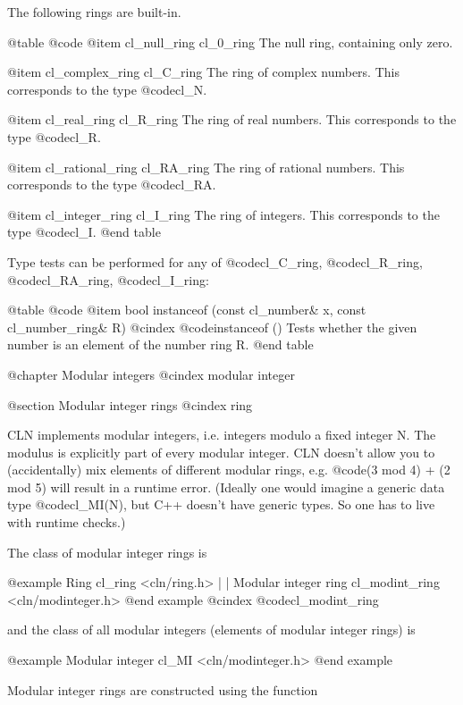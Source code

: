 The following rings are built-in.

@table @code
@item cl_null_ring cl_0_ring
The null ring, containing only zero.

@item cl_complex_ring cl_C_ring
The ring of complex numbers. This corresponds to the type @code{cl_N}.

@item cl_real_ring cl_R_ring
The ring of real numbers. This corresponds to the type @code{cl_R}.

@item cl_rational_ring cl_RA_ring
The ring of rational numbers. This corresponds to the type @code{cl_RA}.

@item cl_integer_ring cl_I_ring
The ring of integers. This corresponds to the type @code{cl_I}.
@end table

Type tests can be performed for any of @code{cl_C_ring}, @code{cl_R_ring},
@code{cl_RA_ring}, @code{cl_I_ring}:

@table @code
@item bool instanceof (const cl_number& x, const cl_number_ring& R)
@cindex @code{instanceof ()}
Tests whether the given number is an element of the number ring R.
@end table


@chapter Modular integers
@cindex modular integer

@section Modular integer rings
@cindex ring

CLN implements modular integers, i.e. integers modulo a fixed integer N.
The modulus is explicitly part of every modular integer. CLN doesn't
allow you to (accidentally) mix elements of different modular rings,
e.g. @code{(3 mod 4) + (2 mod 5)} will result in a runtime error.
(Ideally one would imagine a generic data type @code{cl_MI(N)}, but C++
doesn't have generic types. So one has to live with runtime checks.)

The class of modular integer rings is

@example
                         Ring
                       cl_ring
                     <cln/ring.h>
                          |
                          |
                 Modular integer ring
                    cl_modint_ring
                  <cln/modinteger.h>
@end example
@cindex @code{cl_modint_ring}

and the class of all modular integers (elements of modular integer rings) is

@example
                    Modular integer
                         cl_MI
                   <cln/modinteger.h>
@end example

Modular integer rings are constructed using the function


